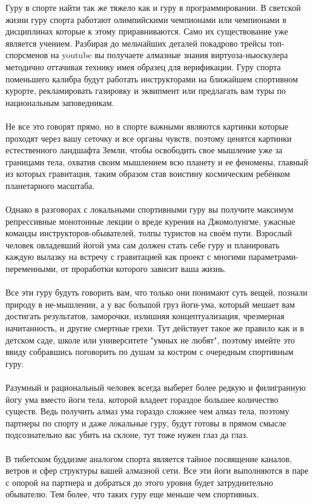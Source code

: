 Гуру в спорте найти так же тяжело как и гуру в программировании. В светской жизни гуру спорта работают олимпийскими чемпионами или чемпионами в дисциплинах которые к этому приравниваются. Само их существование уже является учением. Разбирая до мельчайших деталей покадрово трейсы топ-спорсменов на youtube вы получаете алмазные знания виртуоза-ньюскулера методично оттачивая технику имея образец для верификации. Гуру спорта поменьшего калибра будут работать инструкторами на ближайшем спортивном курорте, рекламировать газировку и эквипмент или предлагать вам туры по национальным заповедникам.
\\
\\
Не все это говорят прямо, но в спорте важными являются картинки которые проходят через вашу сеточку и все органы чувств, поэтому ценятся картинки естественного ландшафта Земли, чтобы освободить свое мышление уже за границами тела, охватив своим мышлением всю планету и ее феномены, главный из которых   гравитация, таким образом став воистину космическим ребёнком планетарного масштаба.
\\
\\
Однако в разговорах с локальными спортивными гуру вы получите максимум репрессивные монотонные лекции о вреде курения на Джомолунгме, ужасные команды инструкторов-обывателей, толпы туристов на своём пути. Взрослый человек овладевший йогой ума сам должен стать себе гуру и планировать каждую вылазку на встречу с гравитацией как проект с многими параметрами-переменными, от проработки которого зависит ваша жизнь.
\\
\\
Все эти гуру будуть говорить вам, что только они понимают суть вещей, познали природу в не-мышлении, а у вас большой груз йоги-ума, который мешает вам достигать результатов, заморочки, излишняя концептуализация, чрезмерная начитанность, и другие смертные грехи. Тут действует такое же правило как и в детском саде, школе или университете   "умных не любят", поэтому имейте это ввиду собравшись поговорить по душам за костром с очередным спортивным гуру.
\\
\\
Разумный и рациональный человек всегда выберет более редкую и филигранную йогу ума вместо йоги тела, которой владеет гораздое большее количество существ. Ведь получить алмаз ума гораздо сложнее чем алмаз тела, поэтому партнеры по спорту и даже локальные гуру, будут готовы в прямом смысле подсознательно вас убить на склоне, тут тоже нужен глаз да глаз.
\\
\\
В тибетском буддизме аналогом спорта является тайное посвящение каналов, ветров и сфер   структуры вашей алмазной сети. Все эти йоги выполняются в паре с опорой на партнера и добраться до этого уровня будет затруднительно обывателю. Тем более, что таких гуру еще меньше чем спортивных.
\\

